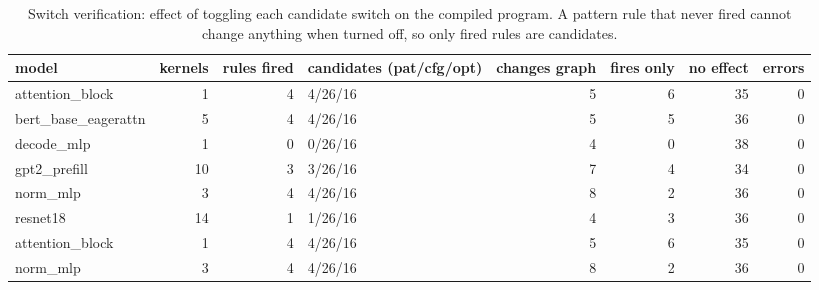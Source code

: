 \begin{table}[h]\centering\scriptsize
\begin{tabular}{lrrlrrrr}\toprule
model & kernels & rules fired & candidates (pat/cfg/opt) & changes graph & fires only & no effect & errors \\\midrule
attention\_block & 1 & 4 & 4/26/16 & 5 & 6 & 35 & 0 \\
bert\_base\_eagerattn & 5 & 4 & 4/26/16 & 5 & 5 & 36 & 0 \\
decode\_mlp & 1 & 0 & 0/26/16 & 4 & 0 & 38 & 0 \\
gpt2\_prefill & 10 & 3 & 3/26/16 & 7 & 4 & 34 & 0 \\
norm\_mlp & 3 & 4 & 4/26/16 & 8 & 2 & 36 & 0 \\
resnet18 & 14 & 1 & 1/26/16 & 4 & 3 & 36 & 0 \\
attention\_block & 1 & 4 & 4/26/16 & 5 & 6 & 35 & 0 \\
norm\_mlp & 3 & 4 & 4/26/16 & 8 & 2 & 36 & 0 \\
\bottomrule\end{tabular}
\caption{Switch verification: effect of toggling each candidate switch on the compiled program. A pattern rule that never fired cannot change anything when turned off, so only fired rules are candidates.}\label{tab:verify}
\end{table}%

